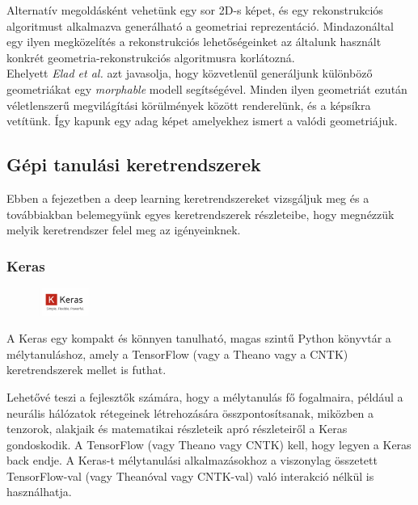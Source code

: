\documentclass[12pt,a4]{article}
\begin{document}
	
	Alternatív megoldásként vehetünk egy sor 2D-s képet, és egy rekonstrukciós algoritmust alkalmazva generálható a geometriai reprezentáció.
	Mindazonáltal egy ilyen megközelítés
	a rekonstrukciós lehetőségeinket az általunk használt konkrét geometria-rekonstrukciós algoritmusra korlátozná. \\
	
	
	Ehelyett \textit{Elad et al.} \cite{synthetic} azt javasolja, hogy közvetlenül generáljunk különböző
	geometriákat egy \textit{morphable} modell segítségével. 
	Minden ilyen geometriát
	ezután véletlenszerű megvilágítási körülmények között renderelünk, és a képsíkra vetítünk. Így kapunk egy adag képet
	amelyekhez ismert a valódi geometriájuk.
	
	\subsection{Gépi tanulási keretrendszerek}
	
	Ebben a fejezetben a deep learning keretrendszereket vizsgáljuk meg és a továbbiakban belemegyünk egyes keretrendszerek részleteibe, hogy megnézzük melyik keretrendszer felel meg az igényeinknek.
	
	\subsubsection{Keras}
	\setlength\intextsep{12pt}
	\begin{figure}
		\centering
		\includegraphics[width=0.15\textwidth]{keras}
	\end{figure}
	\cite{keras}A Keras egy kompakt és könnyen tanulható, magas szintű Python könyvtár a mélytanuláshoz, amely a TensorFlow (vagy a Theano vagy a CNTK) keretrendszerek mellet is futhat. 
	
	
	Lehetővé teszi a fejlesztők számára, hogy a mélytanulás fő fogalmaira, például a neurális hálózatok rétegeinek létrehozására összpontosítsanak, miközben a tenzorok, alakjaik és matematikai részleteik apró részleteiről a Keras gondoskodik. A TensorFlow (vagy Theano vagy CNTK) kell, hogy legyen a Keras back endje. A Keras-t mélytanulási alkalmazásokhoz a viszonylag összetett TensorFlow-val (vagy Theanóval vagy CNTK-val) való interakció nélkül is használhatja.
	
	
\end{document}
